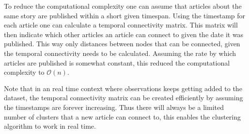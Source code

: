 To reduce the computational complexity one can assume that articles about the same story are published within a short given timespan. Using the timestamp for each article one can calculate a temporal connectivity matrix. This matrix will then indicate which other articles an article can connect to given the date it was published. This way only distances between nodes that can be connected, given the temporal connectivity needs to be calculated. Assuming the rate by which articles are published is somewhat constant, this reduced the computational complexity to $\mathcal{O}(n)$.

Note that in an real time context where observations keeps getting added to the dataset, the temporal connectivity matrix can be created efficiently by assuming the timestamps are forever increasing. Thus there will always be a limited number of clusters that a new article can connect to, this enables the clustering algorithm to work in real time.
